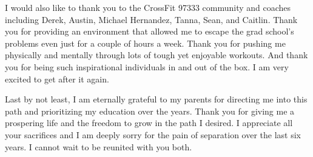 I would also like to thank you to the CrossFit 97333 community
and coaches including Derek, Austin, Michael Hernandez, Tanna, Sean, and Caitlin.
Thank you for providing an environment that 
allowed me to escape the grad school's problems even just for a couple of hours a week. Thank you
for pushing me physically and mentally through lots of tough yet enjoyable workouts. And thank you
for being such inspirational individuals in and out of the box.
I am very excited to get after it again.
%
%

Last by not least, I am eternally grateful 
to my parents for directing me into this path and prioritizing my education over the years. 
Thank you for giving me a prospering life and the freedom to grow in the path I desired.
I appreciate all your sacrifices and I am deeply sorry for the pain of separation over the last six 
years. I cannot wait to be reunited with you both.



